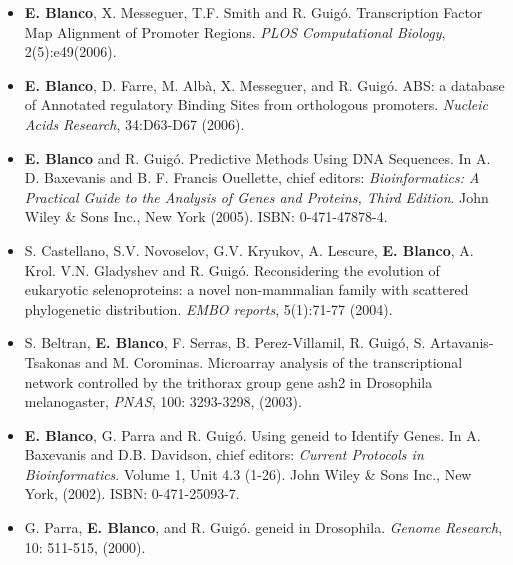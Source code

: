 \vspace{1cm}

\begin{itemize}
\item
\textbf{E. Blanco}, X. Messeguer, T.F. Smith and R. Guig\'{o}. Transcription Factor Map Alignment of Promoter Regions. \emph{PLOS Computational Biology}, 2(5):e49(2006). 
\item
\textbf{E. Blanco}, D. Farre, M. Alb\`a, X. Messeguer, and R. Guig\'{o}. ABS: a database of Annotated regulatory Binding Sites from orthologous promoters. \emph{Nucleic Acids Research}, 34:D63-D67 (2006). 
\item
\textbf{E. Blanco} and R. Guig\'{o}. Predictive Methods Using DNA Sequences. In A. D. Baxevanis and B. F. Francis Ouellette, chief editors: \emph{Bioinformatics: A Practical Guide to the Analysis of Genes and Proteins, Third Edition}. John Wiley \& Sons Inc., New York (2005).
ISBN: 0-471-47878-4. 

\item
S. Castellano, S.V. Novoselov, G.V. Kryukov, A. Lescure, \textbf{E. Blanco}, A. Krol. V.N. Gladyshev and R. Guig\'{o}. Reconsidering the evolution of eukaryotic selenoproteins: a novel non-mammalian family with scattered phylogenetic distribution. \emph{EMBO reports}, 5(1):71-77 (2004). 

\item 
S. Beltran, \textbf{E. Blanco}, F. Serras, B. Perez-Villamil, R. Guig\'{o}, S. Artavanis-Tsakonas and 
M. Corominas. Microarray analysis of the transcriptional network controlled by the trithorax group 
gene ash2 in Drosophila melanogaster, \emph{PNAS}, 100: 3293-3298, (2003). 

\item
\textbf{E. Blanco}, G. Parra and R. Guig\'{o}. Using geneid to Identify Genes. In A. Baxevanis and D.B. Davidson, chief editors: \emph{Current Protocols in Bioinformatics}. Volume 1, Unit 4.3 (1-26). John Wiley \& Sons Inc., New York, (2002). ISBN: 0-471-25093-7.

\item 
G. Parra, \textbf{E. Blanco}, and R. Guig\'{o}. geneid in Drosophila. \emph
{Genome Research}, 10: 511-515, (2000).
\end{itemize}

